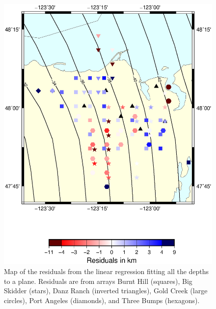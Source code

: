 \documentclass[draft]{agujournal2019}
\begin{document}
\begin{figure}
\noindent\includegraphics[width=\textwidth, trim={1cm 5cm 3.5cm 4cm},clip]{figures/error_PWS_PWS.eps}
\caption{Map of the residuals from the linear regression fitting all the depths to a plane. Residuals are from arrays Burnt Hill (squares), Big Skidder (stars), Danz Ranch (inverted triangles),  Gold Creek (large circles), Port Angeles (diamonds), and Three Bumps (hexagons).}
\label{pngfiguresample}
\end{figure}
\end{document}

